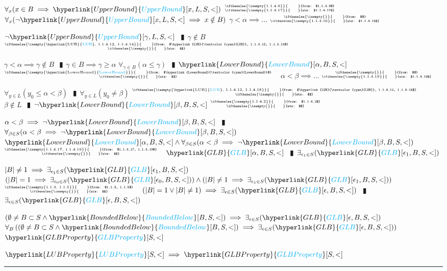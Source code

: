 \documentclass{book}
\newcommand{\rf}[1]{\hyperlink{#1}{\textcolor{cyan}{#1}}}
\newcommand{\pipe}{$\phantom{(}\vrectangleblack\phantom{)}$}
\newcommand{\pr}[1]{\left(#1\right)}
\newcommand{\ann}[2]{%
  \hfill %
  $\stackrel%
  {\hbox{\tiny{\ifthenelse{\isempty{#1}}%
    {\phantom{from}}%
    {from: $#1$}}}}%
  {\hbox{\tiny{\ifthenelse{\isempty{#2}}%
    {\phantom{wts}}%
    {wts: $#2$}}}}$%
\ }
\begin{document}
\begin{enumerate}
\begin{enumerate}
\begin{enumerate}
\begin{enumerate}
        \lit $\forall_{x}(x \in B \implies \rf{UpperBound}[x, L, S, <])$    \ann{1.1.4.9}{1.1.4.17}
        \lit $\forall_{x}(\lnot \rf{UpperBound}[x, L, S, <] \implies x \notin B)$
        \lit $\gamma < \alpha \implies \ldots$    \ann{}{1.1.4.16}
        \begin{enumerate}
          \lit $\lnot \rf{UpperBound}[\gamma, L, S, <]$ \pipe $\gamma \notin B$    \ann{\rf{LUB}, 1.1.4.12, 1.1.4.14}{}
        \end{enumerate}
        \lit $\gamma < \alpha \implies \gamma \notin B$ \pipe $\gamma \in B \implies \gamma \geq \alpha$
        \lit $\forall_{\gamma \in B}(\alpha \leq \gamma)$ \pipe $\rf{LowerBound}[\alpha, B, S, <]$    \ann{\rf{LowerBound}}{}
        \lit $\alpha < \beta \implies \ldots$    \ann{}{1.1.4.19}
        \begin{enumerate}
          \lit $\forall_{y \in L}(y_0 \leq \alpha < \beta)$ \pipe $\forall_{y \in L}(y_0 \neq \beta)$   \ann{\rf{LUB}, 1.1.4.12, 1.1.4.18}{}
          \lit $\beta \notin L$ \pipe $\lnot \rf{LowerBound}[\beta, B, S, <]$    \ann{1.1.4.2}{}
        \end{enumerate}
        \lit $\alpha < \beta \implies \lnot \rf{LowerBound}[\beta, B, S, <]$ \pipe $\forall_{\beta \in S}(\alpha < \beta \implies \lnot \rf{LowerBound}[\beta, B, S, <])$
        \lit $\rf{LowerBound}[\alpha, B, S, <] \land \forall_{\beta \in S}(\alpha < \beta \implies \lnot \rf{LowerBound}[\beta, B, S, <])$    \ann{1.1.4.17, 1.1.4.19}{}
        \lit $\rf{GLB}[\alpha, B, S, <]$ \pipe $\exists_{\epsilon_1 \in S}(\rf{GLB}[\epsilon_1, B, S, <])$
      \end{enumerate}
      \lit $|B| \neq 1 \implies \exists_{\epsilon_1 \in S}(\rf{GLB}[\epsilon_1, B, S, <])$
    \lit $\pr{|B| = 1 \implies \exists_{\epsilon_0 \in S}(\rf{GLB}[\epsilon_0, B, S, <])} \land \pr{|B| \neq 1 \implies \exists_{\epsilon_1 \in S}(\rf{GLB}[\epsilon_1, B, S, <])}$    \ann{1.1.3, 1.1.5}{}
    \lit $(|B| = 1 \lor |B| \neq 1) \implies \exists_{\epsilon \in S}(\rf{GLB}[\epsilon, B, S, <])$ \pipe $\exists_{\epsilon \in S}(\rf{GLB}[\epsilon, B, S, <])$
    \end{enumerate}
    \lit $(\emptyset \neq B \subset S \land \rf{BoundedBelow}[B, S, <]) \implies \exists_{\epsilon \in S}(\rf{GLB}[\epsilon, B, S, <])$
    \lit $\forall_{B}\pr{(\emptyset \neq B \subset S \land \rf{BoundedBelow}[B, S, <]) \implies \exists_{\epsilon \in S}(\rf{GLB}[\epsilon, B, S, <])}$
    \lit $\rf{GLBProperty}[S, <]$
  \end{enumerate}
  \lit $\rf{LUBProperty}[S, <] \implies \rf{GLBProperty}[S, <]$ 
\end{enumerate} \vspace{.75mm} \hrule \vspace{.75mm} \ \\
\end{document}
